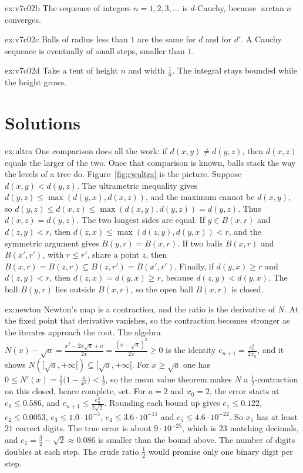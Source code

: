 \begin{hint}{ex:v7c02b}
The sequence of integers $n=1,2,3,\ldots$ is $d$-Cauchy, because $\arctan n$ converges.
\end{hint}
\begin{hint}{ex:v7c02c}
Balls of radius less than $1$ are the same for $d$ and for $d'$. A Cauchy sequence is eventually of small steps, smaller than $1$.
\end{hint}
\begin{hint}{ex:v7c02d}
Take a tent of height $n$ and width $\frac1n$. The integral stays bounded while the height grows.
\end{hint}

\section{Solutions}

\begin{solution}{ex:ultra}
\idea One comparison does all the work: if $d(x,y)\ne d(y,z)$, then $d(x,z)$ equals the larger of the two. Once that comparison is known, balls stack the way the levels of a tree do. Figure~\ref{fig:rwultra} is the picture.
\writeup Suppose $d(x,y)<d(y,z)$. The ultrametric inequality gives $d(y,z)\le\max(d(y,x),d(x,z))$, and the maximum cannot be $d(x,y)$, so $d(y,z)\le d(x,z)\le\max(d(x,y),d(y,z))=d(y,z)$. Thus $d(x,z)=d(y,z)$. The two longest sides are equal. If $y\in B(x,r)$ and $d(z,y)<r$, then $d(z,x)\le\max(d(z,y),d(y,x))<r$, and the symmetric argument gives $B(y,r)=B(x,r)$. If two balls $B(x,r)$ and $B(x',r')$, with $r\le r'$, share a point $z$, then $B(x,r)=B(z,r)\subseteq B(z,r')=B(x',r')$. Finally, if $d(y,x)\ge r$ and $d(z,y)<r$, then $d(z,x)=d(y,x)\ge r$, because $d(z,y)<d(y,x)$. The ball $B(y,r)$ lies outside $B(x,r)$, so the open ball $B(x,r)$ is closed.
\end{solution}

\begin{solution}{ex:newton}
\idea Newton's map is a contraction, and the ratio is the derivative of $N$. At the fixed point that derivative vanishes, so the contraction becomes stronger as the iterates approach the root.
\writeup The algebra $N(x)-\sqrt a=\frac{x^2-2x\sqrt a+a}{2x}=\frac{(x-\sqrt a)^2}{2x}\ge0$ is the identity $e_{n+1}=\frac{e_n^2}{2x_n}$, and it shows $N([\sqrt a,+\infty[)\subseteq[\sqrt a,+\infty[$. For $x\ge\sqrt a$ one has $0\le N'(x)=\frac12\bigl(1-\frac a{x^2}\bigr)<\frac12$, so the mean value theorem makes $N$ a $\frac12$-contraction on this closed, hence complete, set. For $a=2$ and $x_0=2$, the error starts at $e_0\le0.586$, and $e_{n+1}\le\frac{e_n^2}{2\sqrt2}$. Rounding each bound up gives $e_1\le0.122$, $e_2\le0.0053$, $e_3\le1.0\cdot10^{-5}$, $e_4\le3.6\cdot10^{-11}$ and $e_5\le4.6\cdot10^{-22}$. So $x_5$ has at least $21$ correct digits. The true error is about $9\cdot10^{-25}$, which is $23$ matching decimals, and $e_1=\frac32-\sqrt2\approx0.086$ is smaller than the bound above. The number of digits doubles at each step. The crude ratio $\frac12$ would promise only one binary digit per step.
\end{solution}

